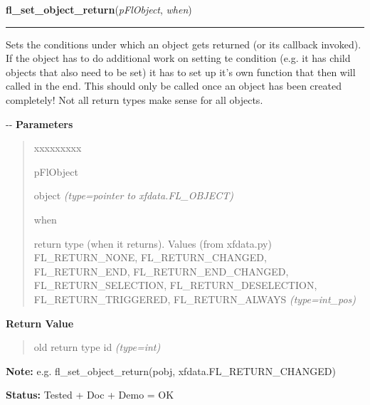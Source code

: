 \hspace{.8\funcindent}\begin{boxedminipage}{\funcwidth}

    \raggedright \textbf{fl\_set\_object\_return}(\textit{pFlObject}, \textit{when})

    \vspace{-1.5ex}

    \rule{\textwidth}{0.5\fboxrule}
\setlength{\parskip}{2ex}

Sets the conditions under which an object gets returned (or its callback
invoked). If the object has to do additional work on setting te condition
(e.g. it has child objects that also need to be set) it has to set up it's
own function that then will called in the end. This should only be called
once an object has been created completely! Not all return types make
sense for all objects.

-{}-
\setlength{\parskip}{1ex}
      \textbf{Parameters}
      \vspace{-1ex}

      \begin{quote}
        \begin{Ventry}{xxxxxxxxx}

          \item[pFlObject]


object
            {\it (type=pointer to xfdata.FL\_OBJECT)}

          \item[when]


return type (when it returns). Values (from xfdata.py)
FL\_RETURN\_NONE, FL\_RETURN\_CHANGED, FL\_RETURN\_END,
FL\_RETURN\_END\_CHANGED, FL\_RETURN\_SELECTION, FL\_RETURN\_DESELECTION,
FL\_RETURN\_TRIGGERED, FL\_RETURN\_ALWAYS
            {\it (type=int\_pos)}

        \end{Ventry}

      \end{quote}

      \textbf{Return Value}
    \vspace{-1ex}

      \begin{quote}

old return type id
      {\it (type=int)}

      \end{quote}

\textbf{Note:} 
e.g. fl\_set\_object\_return(pobj, xfdata.FL\_RETURN\_CHANGED)


\textbf{Status:} 
Tested + Doc + Demo = OK


    \end{boxedminipage}

